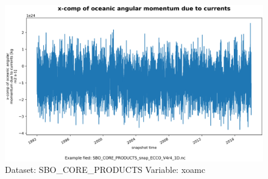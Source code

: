 \begin{figure}[H]
\centering
\includegraphics[scale=0.55]{../images/plots/oneD_plots/SBO_Core_Products/xoamc.png}
\caption{Dataset: SBO\_CORE\_PRODUCTS Variable: xoamc}
\label{tab:table-SBO_CORE_PRODUCTS_xoamc-Plot}
\end{figure}
\pagebreak
